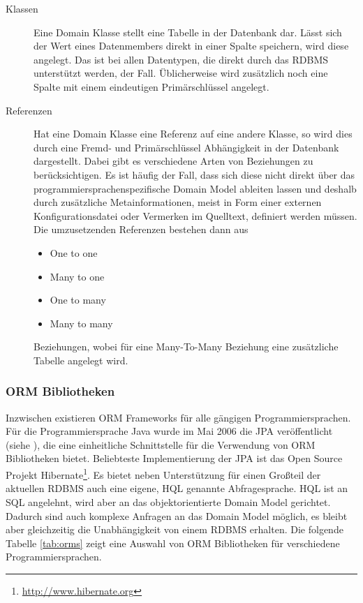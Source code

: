 \begin{description}
	\item[Klassen] Eine Domain Klasse stellt eine Tabelle in der
		Datenbank dar. Lässt sich der Wert eines Datenmembers direkt in einer Spalte
		speichern, wird diese angelegt. Das ist bei allen Datentypen, die direkt
		durch das \ac{RDBMS} unterstützt werden, der Fall. Üblicherweise wird
		zusätzlich noch eine Spalte mit einem eindeutigen Primärschlüssel angelegt.
  	\item[Referenzen] Hat eine Domain Klasse eine Referenz auf eine andere
  		Klasse, so wird dies durch eine Fremd- und Primärschlüssel Abhängigkeit in
  		der Datenbank dargestellt. Dabei gibt es verschiedene Arten von Beziehungen
  		zu berücksichtigen. Es ist häufig der Fall, dass sich diese nicht direkt
  		über das programmiersprachenspezifische Domain Model ableiten lassen
  		und deshalb durch zusätzliche Metainformationen, meist in Form einer
  		externen Konfigurationsdatei oder Vermerken im Quelltext,
  		definiert werden müssen. Die umzusetzenden Referenzen bestehen dann aus
  		\begin{itemize}
            \item One to one
            \item Many to one
            \item One to many
            \item Many to many
          \end{itemize}
        Beziehungen, wobei für eine Many-To-Many Beziehung eine zusätzliche
        Tabelle angelegt wird.
\end{description}

\subsubsection{ORM Bibliotheken}\label{subsec:ormframeworks}
Inzwischen existieren \ac{ORM} Frameworks für alle gängigen Programmiersprachen.
Für die Programmiersprache Java wurde im Mai 2006 die \ac{JPA} veröffentlicht
(siehe \cite{jsr220}), die eine einheitliche Schnittstelle für die Verwendung von
\ac{ORM} Bibliotheken bietet. Beliebteste Implementierung der \ac{JPA} ist das
Open Source Projekt Hibernate\footnote{\url{http://www.hibernate.org}}. Es bietet
neben Unterstützung für einen Großteil der aktuellen \ac{RDBMS} auch eine eigene,
\ac{HQL} genannte Abfragesprache. \ac{HQL} ist an \ac{SQL} angelehnt, wird aber
an das objektorientierte Domain Model gerichtet. Dadurch sind auch komplexe
Anfragen an das Domain Model möglich, es bleibt aber gleichzeitig die
Unabhängigkeit von einem \ac{RDBMS} erhalten. Die folgende Tabelle \ref{tab:orms}
zeigt eine Auswahl von \ac{ORM} Bibliotheken für verschiedene
Programmiersprachen.

